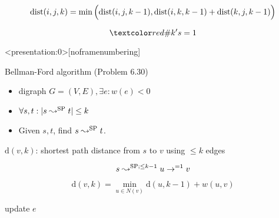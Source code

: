 
\begin{frame}{}

  \[
    \text{dist}(i,j,k) = \min\Big(\text{dist}(i,j,k-1), \text{dist}(i,k,k-1) + \text{dist}(k,j,k-1)\Big)
  \]

  \[
    \red{\# k's = 1}
  \]
\end{frame}

\begin{frame}{}
  
\end{frame}

\begin{frame}<presentation:0>[noframenumbering]
  \begin{exampleblock}{Bellman-Ford algorithm (Problem 6.30)}
    \begin{itemize}
      \item digraph $G = (V, E), \exists e: w(e) < 0$
      \item $\forall s, t: |s \leadsto^{\text{SP}} t| \le k$
      \item Given $s,t$, find $s \leadsto^{\text{SP}} t$.
    \end{itemize}
  \end{exampleblock}

  $\text{d}(v,k)$: shortest path distance from $s$ to $v$ using $\le k$ edges

  \[
    s \leadsto^{\text{SP}; \le k-1} u \to^{=1} v
  \]

  \[
    \text{d}(v, k) = \min_{u \in N(v)} \text{d}(u, k-1) + w(u,v)
  \]

  \begin{center}
    \begin{minipage}{0.50\linewidth}
      \begin{algorithmic}[c]
		\State update $e$
	  \EndFor
	\EndFor
      \end{algorithmic}
    \end{minipage}
  \end{center}
\end{frame}

